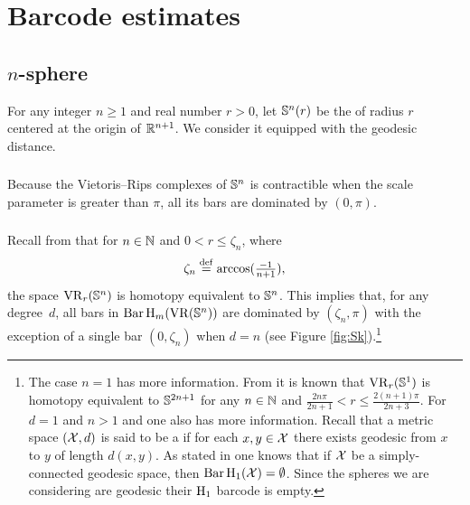 
\section{Barcode estimates}\label{s:computations}

\subsection{$n$-sphere}\label{ss:Sn}

For any integer $n \geq 1$ and real number $r > 0$, let $\mathbb{S}^n(r)$ be the  of radius $r$ centered at the origin of $\mathbb{R}^{n+1}$.
We consider it equipped with the geodesic distance.

\subsubsection{}

Because the Vietoris--Rips complexes of $\mathbb{S}^n$ is contractible when the scale parameter is greater than $\pi$, all its bars are dominated by $(0, \pi)$.

\subsubsection{} 

Recall from \cite[Thm.~7.1]{lim2020vietoris} that for $n \in \mathbb{N}$ and  $0 < r \leq \zeta_n$, where 
\[\zeta_n \stackrel{\mathrm{def}}{=} \arccos(\tfrac{-1}{n+1}),\] 
the space $\operatorname{VR}_r(\mathbb{S}^n)$ is homotopy equivalent to $\mathbb{S}^n$.
This implies that, for any degree~$d$, all bars in $\operatorname{Bar}\mathrm{H}_m (\operatorname{VR}(\mathbb{S}^n))$ are dominated by $(\zeta_n,\pi)$ with the exception of a single bar $(0,\zeta_n)$ when $d = n$ (see Figure \ref{fig:Sk}).\footnote{
	The case $n = 1$ has more information.
	From \cite[Thm.~7.4]{adamaszek2017vietoris} it is known that $\operatorname{VR}_r(\mathbb{S}^1)$ is homotopy equivalent to $\mathbb{S}^{2n+1}$ for any $n \in \mathbb{N}$ and $\frac{2n\pi}{2n+1} < r \leq \frac{2(n+1)\pi}{2n+3}$.
	For $d=1$ and $n > 1$ and one also has more information.
	Recall that a metric space $(\mathcal{X}, d)$ is said to be a  if for each $x, y \in \mathcal{X}$ there exists geodesic from $x$ to $y$ of length $d(x, y)$.
	As stated in \cite[Prop.~7.10]{virk20201} one knows that if $\mathcal{X}$ be a simply-connected geodesic space, then $\operatorname{Bar}\mathrm{H}_1(\mathcal{X}) = \emptyset$.
	Since the spheres we are considering are geodesic their $\mathrm{H}_1$ barcode is empty. }

